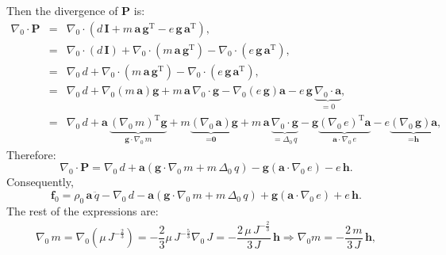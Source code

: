 \documentclass[11pt,a4paper]{article}
\newcommand{\Grad}{\nabla}
\newcommand{\Id}{\textbf{I}}
\begin{document}
Then the divergence of \textbf{P} is:
%
\begin{equation}
\begin{array}{rcl}
\Grad_0\cdot\textbf{P}
&=&\Grad_0\cdot\left( d\,\Id+m\,\textbf{a}\,\textbf{g}^\text{T}
-e\,\textbf{g}\,\textbf{a}^\text{T}\right),\\[1ex]
&=&\Grad_0\cdot\left( d\,\Id\right) +\Grad_0\cdot\left(m\,\textbf{a}\,\textbf{g}^\text{T}\right) 
-\Grad_0\cdot\left(e\,\textbf{g}\,\textbf{a}^\text{T}\right),
\\[1ex]
&=&\Grad_0\,d +\Grad_0\cdot\left(m\,\textbf{a}\,\textbf{g}^\text{T}\right) 
-\Grad_0\cdot\left(e\,\textbf{g}\,\textbf{a}^\text{T}\right),\\[1ex]
&=&\Grad_0\,d +\Grad_0\left(m\,\textbf{a}\right) \textbf{g} +m\,\textbf{a}\,\Grad_0\cdot \textbf{g}
-\Grad_0\left(e\,\textbf{g}\right) \textbf{a} -e\,\textbf{g}\,\underbrace{\Grad_0\cdot \textbf{a}}_{=0},\\[1ex]
&=&\Grad_0\,d +\textbf{a}\,\underbrace{\left(\Grad_0\, m\right)^\text{T} \textbf{g}}_{\textbf{g}\cdot \Grad_0\,m}+m\underbrace{\left( \Grad_0\, \textbf{a}\right)}_{=\textbf{0}}\textbf{g}  +m\,\textbf{a}\,\underbrace{\Grad_0\cdot \textbf{g}}_{=\Delta_0\, q}
-\textbf{g}\underbrace{\left(\Grad_0\, e\right)^\text{T} \textbf{a}}_{\textbf{a}\cdot \Grad_0\, e} -e\underbrace{\left( \Grad_0\, \textbf{g}\right) \textbf{a}}_{=\textbf{h}},
\end{array}
\end{equation}
%
Therefore:
%
\begin{equation}
\boxed{
\Grad_0\cdot\textbf{P}
=\Grad_0\, d
+\textbf{a}\left(\textbf{g}\cdot\Grad_0\, m+m\,\Delta_0\, q\right)
-\textbf{g}\left(\textbf{a}\cdot\Grad_0\, e\right)
-e\,\textbf{h}
}.
\label{eq_DivPCompact}
\end{equation}
%
Consequently,
%
\begin{equation}
\boxed{
\textbf{f}_0
=\rho_0\,\textbf{a}\,\ddot q
-\Grad_0\, d
-\textbf{a}\left(\textbf{g}\cdot\Grad_0\, m+m\,\Delta_0\, q\right)
+\textbf{g}\left(\textbf{a}\cdot\Grad_0\, e\right)
+e\,\textbf{h}
}.
\label{eq_fCompact}
\end{equation}
%
The rest of the expressions are:
%
\begin{eqnarray}\label{eq_gradm}
\Grad_0\, m=\Grad_0\left(\mu\,J^{-\frac{2}{3}}\right)=-\dfrac{2}{3}\mu\,J^{-\frac{5}{3}}\Grad_0\, J =-\dfrac{2\,\mu\,J^{-\frac{2}{3}}}{3\,J}\,\textbf{h}\Rightarrow\boxed{\Grad_0 m=-\dfrac{2\,m}{3\,J}\,\textbf{h}},
\end{eqnarray}
%
\end{document}
